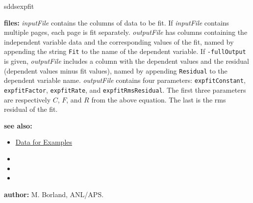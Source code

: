 \begin{sddsprog}{sddsexpfit}
\begin{itemize}
    \end{itemize}
  \item \textbf{files:}
    \emph{inputFile} contains the columns of data to be fit. If \emph{inputFile} contains multiple pages, each page is fit separately. \emph{outputFile} has columns containing the independent variable data and the corresponding values of the fit, named by appending the string \verb|Fit| to the name of the dependent variable. If \verb|-fullOutput| is given, \emph{outputFile} includes a column with the dependent values and the residual (dependent values minus fit values), named by appending \verb|Residual| to the dependent variable name. \emph{outputFile} contains four parameters: \verb|expfitConstant|, \verb|expfitFactor|, \verb|expfitRate|, and \verb|expfitRmsResidual|. The first three parameters are respectively $C$, $F$, and $R$ from the above equation. The last is the rms residual of the fit.
  \item \textbf{see also:}
    \begin{itemize}
      \item \hyperref[exampleData]{Data for Examples}
      \item {}
      \item {}
      \item {}
    \end{itemize}
  \item \textbf{author:} M. Borland, ANL/APS.
\end{sddsprog}

